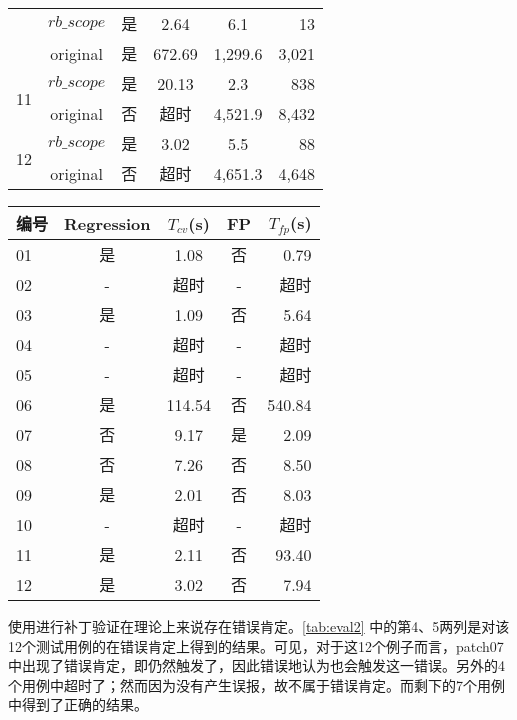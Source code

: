 \begin{table}
\begin{tabular}{|p{0.80cm}|c|c|c|c|r|}
    & $rb\_scope$ &是 &  2.64 & 6.1 & 13  \\  \cline{2-6}
    & original & 是 & 672.69  &  1,299.6 & 3,021  \\
    \hline
    \multirow{2}{0.80cm}{11}
    & $rb\_scope$ &是 &  20.13 & 2.3 & 838  \\  \cline{2-6}
    & original & 否 & 超时  &  4,521.9 & 8,432  \\
    \hline
    \multirow{2}{0.80cm}{12}
    & $rb\_scope$ &是 &  3.02 & 5.5 & 88  \\  \cline{2-6}
    & original & 否 & 超时 &  4,651.3 & 4,648  \\
    \hline
  \end{tabular}
\end{table}

\begin{table}
  \centering
  \small
  \begin{tabular}{|l|c|c|c|r|}
    \hline
    编号 & \footnotesize{Regression} & $T_{cv}$(s) & \footnotesize{FP} &$T_{fp}$(s) \\
    \hline
    01 & 是 & 1.08 & 否 & 0.79 \\ \hline
    02 & - & 超时 & - &超时\\ \hline
    03 & 是 & 1.09 & 否 &5.64\\ \hline
    04 & - & 超时 & - &超时\\ \hline
    05 & - & 超时 & - &超时\\ \hline
    06 & 是 & 114.54 & 否 & 540.84\\ \hline
    07 & 否 & 9.17 & 是 & 2.09\\ \hline
    08 & 否 & 7.26 & 否 & 8.50\\ \hline
    09 & 是 & 2.01 & 否 & 8.03\\ \hline
    10 & - & 超时 & - &超时\\ \hline
    11 & 是 & 2.11 & 否 & 93.40\\ \hline
    12 & 是 & 3.02 & 否 & 7.94\\ \hline
  \end{tabular}
\end{table}


使用\dryrun 进行补丁验证在理论上来说存在错误肯定。\autoref{tab:eval2} 中的第4、5两列是对该12个测试用例的在错误肯定上得到的结果。可见，对于这12个例子而言，patch07中出现了错误肯定，即\dryrun 仍然触发了\bug\ass ，因此错误地认为\bug 也会触发这一错误。另外的4个用例中超时了；然而因为没有产生误报，故不属于错误肯定。而剩下的7个用例中得到了正确的结果。

